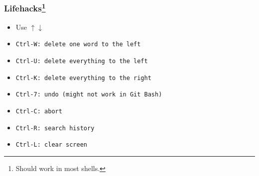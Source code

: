 \begin{frame}
\frametitle{Lifehacks\footnote{Should work in most shells.}}
\begin{itemize}
    \item Use $\uparrow \downarrow$
    \item \tt{Ctrl-W}: delete one word to the left
    \item \tt{Ctrl-U}: delete everything to the left
    \item \tt{Ctrl-K}: delete everything to the right
    \item \tt{Ctrl-7}: undo (might not work in Git Bash)
    \item \tt{Ctrl-C}: abort
    \item \tt{Ctrl-R}: search history
    \item \tt{Ctrl-L}: clear screen
\end{itemize}
\end{frame}
